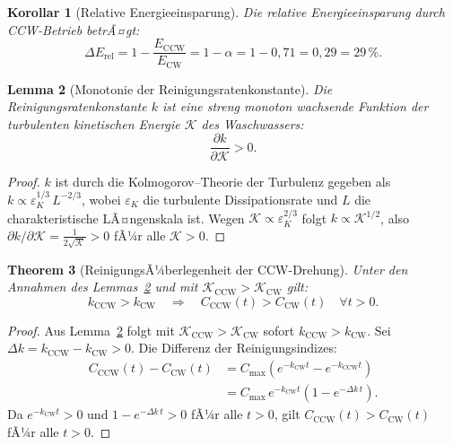 ﻿\documentclass[12pt,a4paper]{article}
\newtheorem{theorem}{Theorem}[section]
\newtheorem{lemma}[theorem]{Lemma}
\newtheorem{korollar}[theorem]{Korollar}
\theoremstyle{remark}
\newcommand{\CCW}{\mathrm{CCW}}
\newcommand{\CW}{\mathrm{CW}}
\begin{document}
	\begin{korollar}[Relative Energieeinsparung]
		Die relative Energieeinsparung durch CCW-Betrieb betrÃ¤gt:
		\begin{equation}
			\Delta E_{\mathrm{rel}} = 1 - \frac{E_{\CCW}}{E_{\CW}} = 1 - \alpha = 1 - 0{,}71 = 0{,}29 = 29\,\%.
		\end{equation}
	\end{korollar}
	
	\begin{lemma}[Monotonie der Reinigungsratenkonstante]
		\label{lem:mono}
		Die Reinigungsratenkonstante $k$ ist eine streng monoton wachsende Funktion
		der turbulenten kinetischen Energie $\mathcal{K}$ des Waschwassers:
		\begin{equation}
			\frac{\partial k}{\partial \mathcal{K}} > 0.
		\end{equation}
	\end{lemma}
	
	\begin{proof}
		$k$ ist durch die Kolmogorov--Theorie der Turbulenz gegeben als
		$k \propto \varepsilon_K^{1/3}\,L^{-2/3}$, wobei $\varepsilon_K$ die turbulente
		Dissipationsrate und $L$ die charakteristische LÃ¤ngenskala ist.
		Wegen $\mathcal{K} \propto \varepsilon_K^{2/3}$ folgt $k \propto \mathcal{K}^{1/2}$,
		also $\partial k / \partial\mathcal{K} = \frac{1}{2\sqrt{\mathcal{K}}} > 0$
		fÃ¼r alle $\mathcal{K} > 0$.\hfill
	\end{proof}
	
	\begin{theorem}[ReinigungsÃ¼berlegenheit der CCW-Drehung]
		\label{thm:reinigung}
		Unter den Annahmen des Lemmas~\ref{lem:mono} und mit
		$\mathcal{K}_{\CCW} > \mathcal{K}_{\CW}$ gilt:
		\begin{equation}
			k_{\CCW} > k_{\CW}
			\quad\Longrightarrow\quad
			C_{\CCW}(t) > C_{\CW}(t) \quad \forall t > 0.
		\end{equation}
	\end{theorem}
	
	\begin{proof}
		Aus Lemma~\ref{lem:mono} folgt mit $\mathcal{K}_{\CCW} > \mathcal{K}_{\CW}$ sofort
		$k_{\CCW} > k_{\CW}$.
		Sei $\Delta k = k_{\CCW} - k_{\CW} > 0$.
		Die Differenz der Reinigungsindizes:
		\begin{align}
			C_{\CCW}(t) - C_{\CW}(t)
			&= C_{\max}\!\left(e^{-k_{\CW}t} - e^{-k_{\CCW}t}\right)\\
			&= C_{\max}\,e^{-k_{\CW}t}\!\left(1 - e^{-\Delta k\,t}\right).
		\end{align}
		Da $e^{-k_{\CW}t} > 0$ und $1 - e^{-\Delta k\,t} > 0$ fÃ¼r alle $t > 0$,
		gilt $C_{\CCW}(t) > C_{\CW}(t)$ fÃ¼r alle $t > 0$.\hfill
	\end{proof}
	
\end{document}
